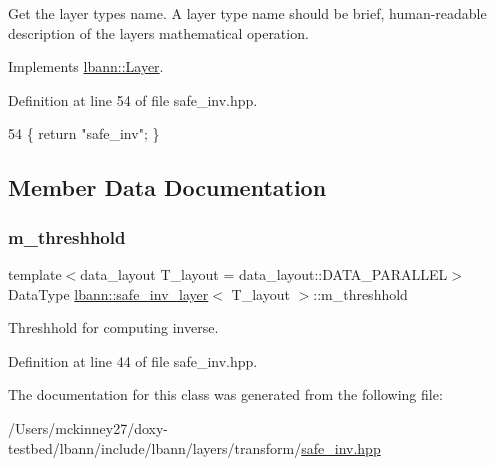 Get the layer type\textquotesingle{}s name. A layer type name should be brief, human-\/readable description of the layer\textquotesingle{}s mathematical operation. 

Implements \hyperlink{classlbann_1_1Layer_a0fa0ea9160b490c151c0a17fde4f7239}{lbann\+::\+Layer}.



Definition at line 54 of file safe\+\_\+inv.\+hpp.


\begin{DoxyCode}
54 \{ \textcolor{keywordflow}{return} \textcolor{stringliteral}{"safe\_inv"}; \}
\end{DoxyCode}


\subsection{Member Data Documentation}
\mbox{\label{classlbann_1_1safe__inv__layer_ae8978232b726f450b961a63e5ff33279}} 
\subsubsection{\texorpdfstring{m\+\_\+threshhold}{m\_threshhold}}
{\footnotesize\ttfamily template$<$data\+\_\+layout T\+\_\+layout = data\+\_\+layout\+::\+D\+A\+T\+A\+\_\+\+P\+A\+R\+A\+L\+L\+EL$>$ \\
Data\+Type \hyperlink{classlbann_1_1safe__inv__layer}{lbann\+::safe\+\_\+inv\+\_\+layer}$<$ T\+\_\+layout $>$\+::m\+\_\+threshhold\hspace{0.3cm}{\ttfamily [private]}}

Threshhold for computing inverse. 

Definition at line 44 of file safe\+\_\+inv.\+hpp.



The documentation for this class was generated from the following file\+:\begin{DoxyCompactItemize}
\item 
/\+Users/mckinney27/doxy-\/testbed/lbann/include/lbann/layers/transform/\hyperlink{safe__inv_8hpp}{safe\+\_\+inv.\+hpp}\end{DoxyCompactItemize}
